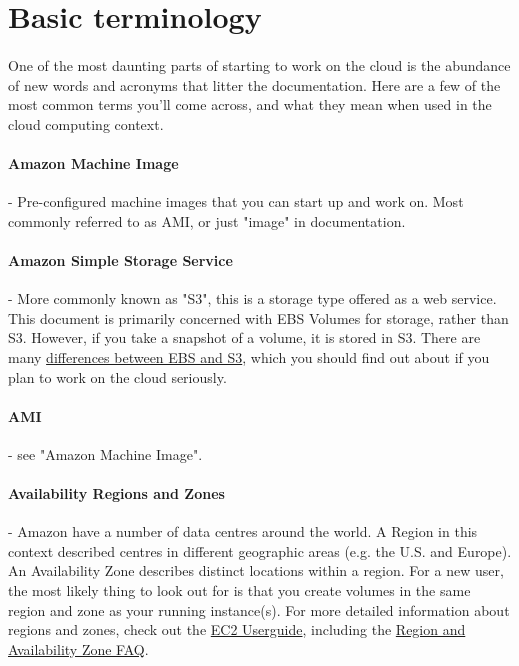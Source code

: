 \section{Basic terminology}
\paragraph{}One of the most daunting parts of starting to work on the cloud is the abundance of new words and acronyms that litter the documentation. Here are a few of the most common terms you'll come across, and what they mean when used in the cloud computing context.

\paragraph{Amazon Machine Image} - Pre-configured machine images that you can start up and work on. Most commonly referred to as AMI, or just "image" in documentation.

\paragraph{Amazon Simple Storage Service} - More commonly known as "S3", this is a storage type offered as a web service. This document is primarily concerned with EBS Volumes for storage, rather than S3. However, if you take a snapshot of a volume, it is stored in S3. There are many \href{http://www.cloudiquity.com/2009/03/differences-between-s3-and-ebs/}{differences between EBS and S3}, which you should find out about if you plan to work on the cloud seriously.

\paragraph{AMI} - see "Amazon Machine Image".

\paragraph{Availability Regions and Zones} - Amazon have a number of data centres around the world. A Region in this context described centres in different geographic areas (e.g. the U.S. and Europe). An Availability Zone describes distinct locations within a region. For a new user, the most likely thing to look out for is that you create volumes in the same region and zone as your running instance(s). For more detailed information about regions and zones, check out the \href{http://docs.amazonwebservices.com/AWSEC2/latest/UserGuide/concepts-regions-availability-zones.html}{EC2 Userguide}, including the \href{http://docs.amazonwebservices.com/AWSEC2/latest/UserGuide/index.html?FAQ_Regions_Availability_Zones.html}{Region and Availability Zone FAQ}.  

